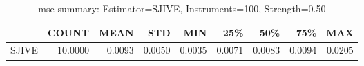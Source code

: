 \begin{table}[ht]
\centering
\caption{mse summary: Estimator=SJIVE, Instruments=100, Strength=0.50}
\begin{tabular}{lrrrrrrrr}
\toprule
 & COUNT & MEAN & STD & MIN & 25\% & 50\% & 75\% & MAX \\
\midrule
SJIVE & 10.0000 & 0.0093 & 0.0050 & 0.0035 & 0.0071 & 0.0083 & 0.0094 & 0.0205 \\
\bottomrule
\end{tabular}
\end{table}
